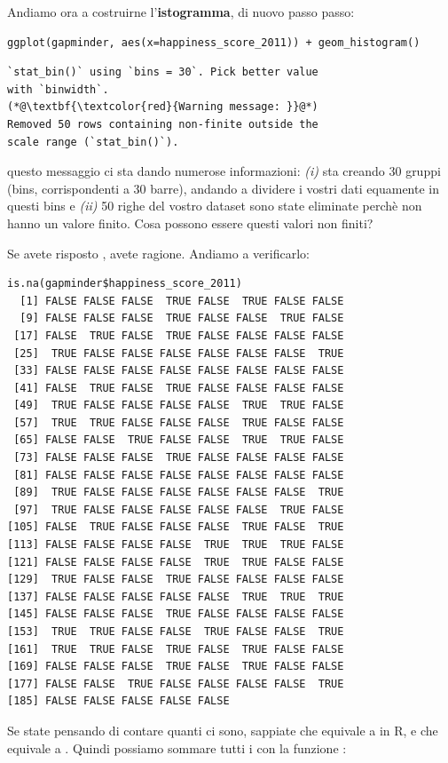 Andiamo ora a costruirne l'\textbf{istogramma}, di nuovo passo passo:

\begin{lstlisting}[style=Rstylescript]
ggplot(gapminder, aes(x=happiness_score_2011)) + geom_histogram()
\end{lstlisting}

\begin{lstlisting}[style=Rstyle]
`stat_bin()` using `bins = 30`. Pick better value
with `binwidth`.
(*@\textbf{\textcolor{red}{Warning message: }}@*)
Removed 50 rows containing non-finite outside the
scale range (`stat_bin()`).
\end{lstlisting}
%
questo messaggio ci sta dando numerose informazioni: \emph{(i)}  sta creando 30 gruppi (bins, corrispondenti a 30 barre), andando a dividere i vostri dati equamente in questi bins e \emph{(ii)} 50 righe del vostro dataset sono state eliminate perch\`e non hanno un valore finito. Cosa possono essere questi valori non finiti? 

\noindent Se avete risposto , avete ragione. Andiamo a verificarlo:

\begin{lstlisting}[style=Rstyle]
is.na(gapminder$happiness_score_2011)
  [1] FALSE FALSE FALSE  TRUE FALSE  TRUE FALSE FALSE
  [9] FALSE FALSE FALSE  TRUE FALSE FALSE  TRUE FALSE
 [17] FALSE  TRUE FALSE  TRUE FALSE FALSE FALSE FALSE
 [25]  TRUE FALSE FALSE FALSE FALSE FALSE FALSE  TRUE
 [33] FALSE FALSE FALSE FALSE FALSE FALSE FALSE FALSE
 [41] FALSE  TRUE FALSE  TRUE FALSE FALSE FALSE FALSE
 [49]  TRUE FALSE FALSE FALSE FALSE  TRUE  TRUE FALSE
 [57]  TRUE  TRUE FALSE FALSE FALSE  TRUE FALSE FALSE
 [65] FALSE FALSE  TRUE FALSE FALSE  TRUE  TRUE FALSE
 [73] FALSE FALSE FALSE  TRUE FALSE FALSE FALSE FALSE
 [81] FALSE FALSE FALSE FALSE FALSE FALSE FALSE FALSE
 [89]  TRUE FALSE FALSE FALSE FALSE FALSE FALSE  TRUE
 [97]  TRUE FALSE FALSE FALSE FALSE FALSE  TRUE FALSE
[105] FALSE  TRUE FALSE FALSE FALSE  TRUE FALSE  TRUE
[113] FALSE FALSE FALSE FALSE  TRUE  TRUE  TRUE FALSE
[121] FALSE FALSE FALSE FALSE  TRUE  TRUE FALSE FALSE
[129]  TRUE FALSE FALSE  TRUE FALSE FALSE FALSE FALSE
[137] FALSE FALSE FALSE FALSE FALSE  TRUE  TRUE  TRUE
[145] FALSE FALSE FALSE  TRUE FALSE FALSE FALSE FALSE
[153]  TRUE  TRUE FALSE FALSE  TRUE FALSE FALSE  TRUE
[161]  TRUE  TRUE FALSE  TRUE FALSE  TRUE FALSE FALSE
[169] FALSE FALSE FALSE  TRUE FALSE  TRUE FALSE FALSE
[177] FALSE FALSE  TRUE FALSE FALSE FALSE FALSE  TRUE
[185] FALSE FALSE FALSE FALSE FALSE
\end{lstlisting}
%
Se state pensando di contare quanti  ci sono, sappiate che  equivale a  in R, e che  equivale a . Quindi possiamo sommare tutti i  con la funzione :

